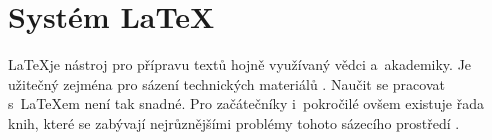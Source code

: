 \documentclass[11pt,a4paper]{article}
\begin{document}
\section{Systém \LaTeX}
\LaTeX je nástroj pro přípravu textů hojně využívaný vědci a~akademiky. Je užitečný zejména pro sázení technických materiálů \cite{helmut:guidetolatex}. Naučit se pracovat s~\LaTeX em není tak snadné. Pro začátečníky i~pokročilé ovšem existuje řada knih, které se zabývají nejrůznějšími problémy tohoto sázecího prostředí \cite{gratzer:practical}.

\newpage

\end{document}
